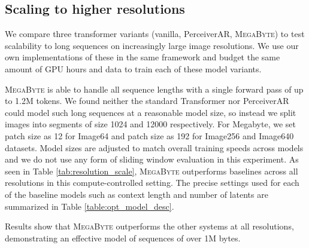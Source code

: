 \documentclass{article}
\newcommand{\fastslow}[0]{\textsc{MegaByte}\xspace}
\newcommand{\megabyte}[0]{\fastslow}
\newcommand{\todo}[1]{\textcolor{red}{[TODO: #1]}}
\theoremstyle{plain}
\theoremstyle{definition}
\theoremstyle{remark}
\begin{document}
\subsection{Scaling to higher resolutions}

We compare three transformer variants (vanilla, PerceiverAR, \megabyte) to test scalability to long sequences on increasingly large image resolutions. We use our own implementations of these in the same framework and budget the same amount of GPU hours and data to train each of these model variants. 

\megabyte is able to handle all sequence lengths with a single forward pass of up to 1.2M tokens. We found neither the standard Transformer nor PerceiverAR could model such long sequences at a reasonable model size, so instead we split images into segments of size 1024 and 12000 respectively.
For Megabyte, we set patch size as 12 for Image64 and patch size as 192 for Image256 and Image640 datasets. Model sizes are adjusted to match overall training speeds across models and we do not use any form of sliding window evaluation in this experiment. As seen in Table \ref{tab:resolution_scale}, \megabyte outperforms baselines across all resolutions in this compute-controlled setting.
The precise settings used for each of the baseline models  such as context length and number of latents are summarized in Table \ref{table:opt_model_desc}.

Results show that \megabyte outperforms the other systems at all resolutions, demonstrating an effective model of sequences of over 1M bytes.

\end{document}
